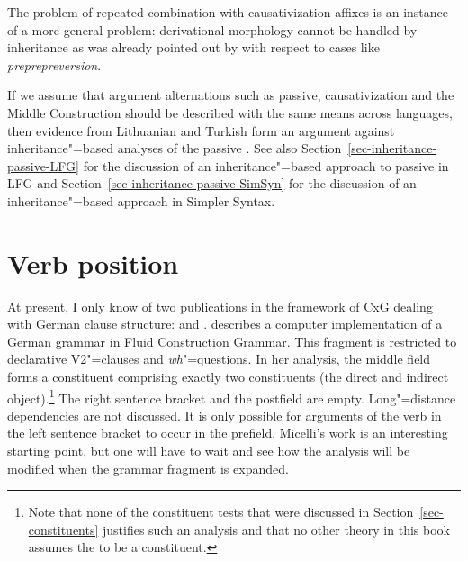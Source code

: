 The problem of repeated combination with causativization affixes is an instance of a more general
problem: derivational morphology cannot be handled by inheritance as was already pointed out by
\citet{KN93a} with respect to cases like \emph{preprepreversion}.

If we assume that argument alternations such as passive, causativization and the Middle Construction should be described with the same means
across languages, then evidence from Lithuanian and Turkish form an argument against
inheritance"=based analyses of the passive \citep{Mueller2006d,Mueller2007d,MWArgSt}. See also
Section~\ref{sec-inheritance-passive-LFG} for the discussion of an inheritance"=based approach to passive in LFG and Section~\ref{sec-inheritance-passive-SimSyn}
for the discussion of an inheritance"=based approach in Simpler Syntax.

\section{Verb position}
\label{sec-verb-position-cxg}

At present, I only know of two publications in the framework of CxG dealing with
German clause structure:  and . \citet{Micelli2012a} describes a computer implementation of a German grammar in Fluid Construction Grammar\indexfcg.
This fragment is restricted to declarative V2"=clauses and \emph{wh}"=questions. In her analysis, the middle field forms a constituent
comprising exactly two constituents (the direct and indirect object).\footnote{%
  Note that none of the constituent tests that were discussed in Section~\ref{sec-constituents}
  justifies such an analysis and that no other theory in this book assumes the \mf to be a constituent.%
} The right sentence bracket and the postfield are empty.
Long"=distance dependencies are not discussed. It is only possible for arguments of the verb in the left sentence bracket to occur
in the prefield. Micelli's work is an interesting starting point, but one will have to wait and see how the analysis will be  modified when
the grammar fragment is expanded.

